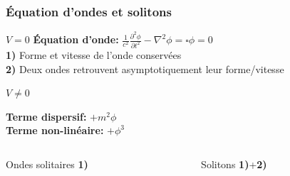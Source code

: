 \documentclass[handout]{beamer}
\begin{document}
\begin{frame}\frametitle{Équation d'ondes et solitons}

\begin{block}{$V=0$}
\textbf{
Équation d'onde:} $\frac{1}{c^2}\frac{\partial^2 \phi}{\partial t^2} - \nabla^2 \phi = \square \phi = 0 $\\[0.25 cm]
\textbf{1)} Forme et vitesse de l'onde conservées
\\\textbf{2)} Deux ondes retrouvent asymptotiquement leur forme/vitesse\\[0.25 cm]
\end{block}



\begin{exampleblock}{$V \neq 0$}

    \textbf{Terme dispersif:} $+m^2\phi$ \\
    \textbf{Terme non-linéaire:} $+\phi^3$\\[0.25 cm]
\begin{columns}[T]
    \begin{column}[T]{.35\linewidth}
    Ondes solitaires \textbf{1)}
    \end{column}
    \begin{column}[T]{.5\linewidth}
    Solitons \textbf{1)}+\textbf{2)} 
    \end{column}
  \end{columns}

\end{exampleblock}




\end{frame}

%
%
%
%
%
%
%
%
\end{document}
